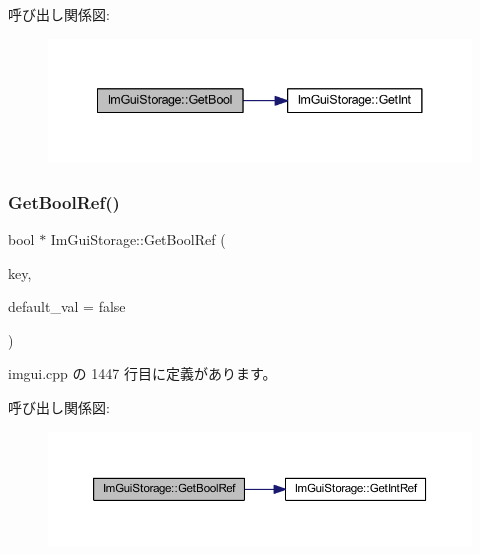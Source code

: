 呼び出し関係図\+:\nopagebreak
\begin{figure}[H]
\begin{center}
\leavevmode
\includegraphics[width=341pt]{struct_im_gui_storage_a22d34ae6278f86468a3e7df8fbd1b632_cgraph}
\end{center}
\end{figure}
\mbox{\label{struct_im_gui_storage_aeb0d62100453d710bac5f6ad0a6e6a2e}} 
\subsubsection{\texorpdfstring{Get\+Bool\+Ref()}{GetBoolRef()}}
{\footnotesize\ttfamily bool $\ast$ Im\+Gui\+Storage\+::\+Get\+Bool\+Ref (\begin{DoxyParamCaption}\item[{\mbox{\hyperlink{imgui_8h_a1785c9b6f4e16406764a85f32582236f}{Im\+Gui\+ID}}}]{key,  }\item[{bool}]{default\+\_\+val = {\ttfamily false} }\end{DoxyParamCaption})}



 imgui.\+cpp の 1447 行目に定義があります。

呼び出し関係図\+:\nopagebreak
\begin{figure}[H]
\begin{center}
\leavevmode
\includegraphics[width=350pt]{struct_im_gui_storage_aeb0d62100453d710bac5f6ad0a6e6a2e_cgraph}
\end{center}
\end{figure}
\mbox{\label{struct_im_gui_storage_a0f51ef327f7e548d003b0e006967c1eb}} 

